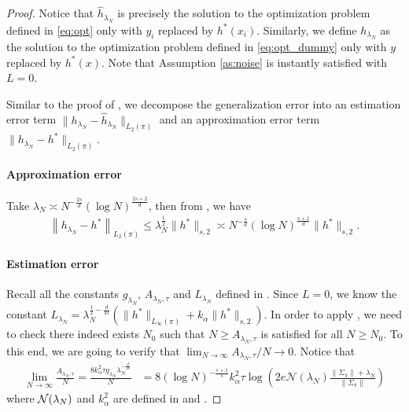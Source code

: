 \begin{proof}
Notice that $ \hat{h}_{\lambda_N} $ is precisely the solution to the optimization problem defined in  \eqref{eq:opt} only with $y_i$ replaced by $h^\ast(x_i)$. 
Similarly, we define $h_{\lambda_N}$ as the solution to the optimization problem defined in \eqref{eq:opt_dummy} only with $y$ replaced by $h^\ast(x)$. 
Note that Assumption \ref{as:noise} is instantly satisfied with $L = 0$. 

Similar to the proof of , we decompose the generalization error into an estimation error term $\| h_{\lambda_N} - \hat{h}_{\lambda_N} \|_{L_2(\pi)}$ and an approximation error term $\| h_{\lambda_N} - h^\ast \|_{L_2(\pi)}$. 

\paragraph{Approximation error}
Take $\lambda_N \asymp N^{-\frac{2s}{d}} (\log N)^{\frac{2s+2}{d}}$, then from , we have 
\begin{align*}
    \left\| h_{\lambda_N} - h^\ast \right\|_{L_2(\pi)} \leq \lambda_N^{\frac{1}{2}} \| h^\ast \|_{s,2} \asymp N^{-\frac{s}{d}}  (\log N)^{\frac{s+1}{d}} \| h^\ast \|_{s,2}.
\end{align*}
\paragraph{Estimation error}
Recall all the constants $g_{\lambda_N}$, $A_{\lambda_N, \tau}$ and $ L_{\lambda_N}$ defined in .
Since $L=0$, we know the constant $L_{\lambda_N} = \lambda_N^{\frac{1}{2} - \frac{d}{4s} } \left( \| h^\ast \|_{L_\infty(\pi)} + k_{\alpha} \|  h^\ast  \|_{s,2} \right)$.
In order to apply , we need to check there indeed exists $N_0$ such that $N \geq A_{\lambda_N, \tau}$ is satisfied for all $N \geq N_0$. 
To this end, we are going to verify that $\lim_{N \to \infty} A_{\lambda_N, \tau} / N \to 0$. 
Notice that
\begin{align*}
    \lim_{N \to \infty} \frac{A_{\lambda_N, \tau}}{N} = \frac{8 k_{\alpha}^2 \tau g_{\lambda_N} \lambda_N^{-\frac{d}{2s} }}{N} &= 8 (\log N)^{- \frac{s+1}{s}} k_{\alpha}^2 \tau \log \left( 2 e \mathcal{N}(\lambda_N) \frac{\| \Sigma_\pi \| + \lambda_N}{ \| \Sigma_\pi \| } \right) 
\end{align*}
where $\mathcal{N}(\lambda_N)$ and $k_{\alpha}^2$ are defined in  and .


\end{proof}
